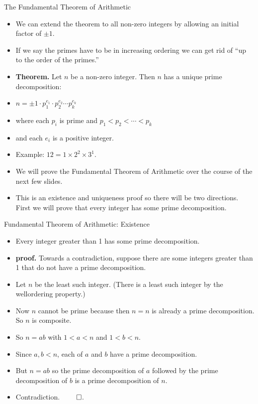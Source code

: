 \documentclass[handout]{beamer}
\begin{document}
\begin{frame}{The Fundamental Theorem of Arithmetic}

\begin{itemize}
  \item We can extend the theorem to all non-zero integers by allowing an initial factor of $\pm 1$.
  \item If we say the primes have to be in increasing ordering we can get rid of ``up to the order of the primes.''
  \item \textbf{Theorem.} Let $n$ be a non-zero integer. Then $n$ has a unique prime decomposition:
  \item $n=\pm1 \cdot p_1^{e_1} \cdot p_2^{e_2} \cdots p_k^{e_k}$
  \item where each $p_i$ is prime and $p_1<p_2<\cdots < p_k$
  \item and each $e_i$ is a positive integer.
  \item Example: $12 = 1 \times 2^2 \times 3^1$.
  \item We will prove the Fundamental Theorem of Arithmetic over the course of the next few slides.
  \item This is an existence and uniqueness proof so there will be two directions. First we
  will prove that every integer has some prime decomposition.
\end{itemize}

\end{frame}

\begin{frame}{Fundamental Theorem of Arithmetic: Existence}

\begin{itemize}
  \item Every integer greater than 1 has some prime decomposition.
  \item \textbf{proof.} Towards a contradiction, suppose there are some integers greater than 1 that do not have a prime decomposition.
  \item Let $n$ be the least such integer. (There is a least such integer by the wellordering property.)
  \item Now $n$ cannot be prime because then $n=n$ is already a prime decomposition. So $n$ is composite.
  \item So $n = ab$ with $1<a<n$ and $1<b<n$.
  \item Since $a,b < n$, each of $a$ and $b$ have a prime decomposition.
  \item But $n=ab$ so the prime decomposition of $a$ followed by the prime decomposition of $b$ is a prime decomposition of $n$.
  \item Contradiction. $\qed$.
\end{itemize}

\end{frame}
\end{document}
